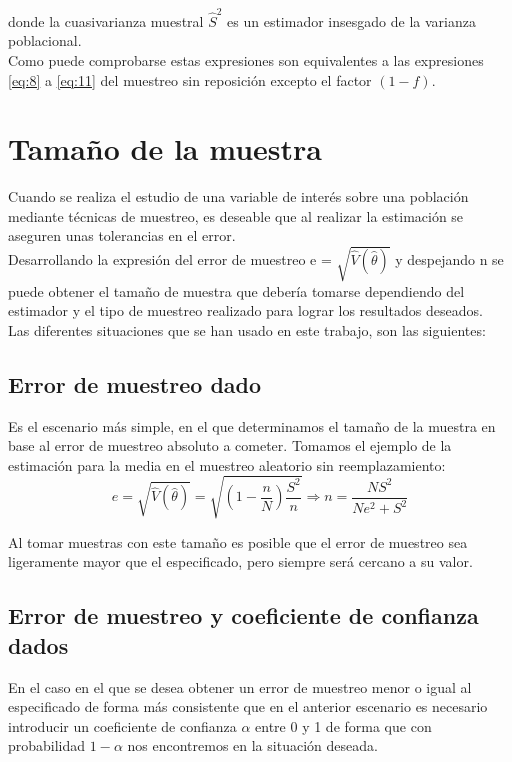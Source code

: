 donde la cuasivarianza muestral $\hat{S}^2$ es un estimador insesgado de la varianza poblacional.\\

Como puede comprobarse estas expresiones son equivalentes a las expresiones \ref{eq:8} a \ref{eq:11} del muestreo sin reposición excepto el factor $(1-f)$.\\
    

\section{Tamaño de la muestra} \label{sect:3.4}
Cuando se realiza el estudio de una variable de interés sobre una población mediante técnicas de muestreo, es deseable que al realizar la estimación se aseguren unas tolerancias en el error.\\

Desarrollando la expresión del error de muestreo e = $\sqrt{ \hat{V}(\hat{\theta})}$ y despejando n se puede obtener el tamaño de muestra que debería tomarse dependiendo del estimador y el tipo de muestreo realizado para lograr los resultados deseados.\\

Las diferentes situaciones que se han usado en este trabajo, son las siguientes:\\

\subsection{Error de muestreo dado}\label{sect:4.4.1}
Es el escenario más simple, en el que determinamos el tamaño de la muestra en base al error de muestreo absoluto a cometer. Tomamos el ejemplo de la estimación para la media en el muestreo aleatorio sin reemplazamiento:\\
\begin{equation}
    e = \sqrt{ \hat{V}(\hat{\theta})} = \sqrt{(1-\frac{n}{N})\frac{S^2}{n}} \Rightarrow n = \frac{NS^2}{Ne^2+S^2} 
\end{equation}

Al tomar muestras con este tamaño es posible que el error de muestreo sea ligeramente mayor que el especificado, pero siempre será cercano a su valor.\\

\subsection{Error de muestreo y coeficiente de confianza dados}\label{sect:4.4.2}
En el caso en el que se desea obtener un error de muestreo menor o igual al especificado de forma más consistente que en el anterior escenario es necesario introducir un coeficiente de confianza $\alpha$ entre 0 y 1 de forma que con probabilidad $1-\alpha$ nos encontremos en la situación deseada.\\


